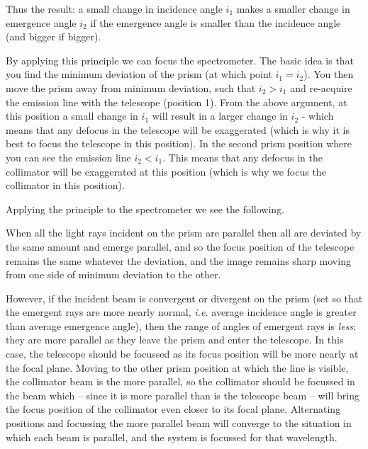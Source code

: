 \documentclass[12pt]{article}
\newcommand{\ie}{ {\em i.e. }}
\begin{document}
\vspace*{3mm}

{\large Thus the result:  a small change in incidence angle $i_1$ makes a smaller change in emergence angle $i_2$ if the emergence angle is smaller than the incidence angle (and bigger if bigger).}\\

\vspace*{3mm}

\noindent
By applying this principle we can focus the spectrometer. The basic idea is that you find the minimum deviation of the prism (at which point $i_1=i_2$). You then move the prism away from minimum deviation, such that $i_2>i_1$ and re-acquire the emission line with the telescope (position 1). From the above argument, at this position a small change in $i_1$ will result in a larger change in $i_2$ - which means that any defocus in the telescope will be exaggerated (which is why it is best to focus the telescope in this position). In the second prism position where you can see the emission line $i_2<i_1$. This means that any defocus in the collimator will be exaggerated at this position (which is why we focus the collimator in this position).


Applying the principle to the spectrometer we see the following.

When all the light rays incident on the prism are parallel then all are deviated by the same amount and emerge parallel, and so the focus position of the telescope remains the same whatever the deviation, and the image remains sharp  moving from one side of minimum deviation to the other. 

However, if the incident beam is convergent or divergent on the prism (set so that the emergent rays are  more nearly normal, \ie average incidence angle is greater than average emergence angle), then the range of angles of emergent rays is {\sl less\/}: they are more parallel as they leave the prism and enter the telescope. In this case, the telescope should be focussed as its focus position will be more nearly at the focal plane. Moving to the other prism position at which the line is visible, the collimator beam is the more parallel, so the collimator should be focussed in the beam which -- since it is more parallel than is the telescope beam -- will bring the focus position of the collimator even closer to its focal plane. Alternating positions and focussing the more parallel beam will converge to the situation in which each beam is parallel, and the system is focussed for that wavelength.
\end{document}

